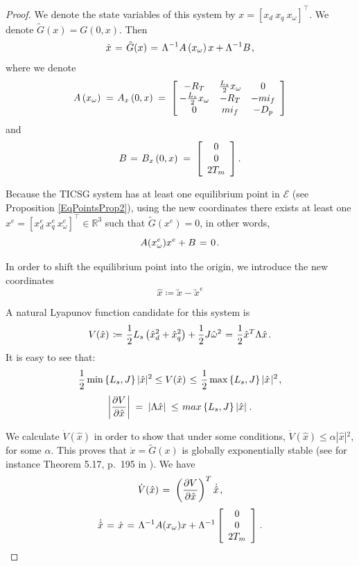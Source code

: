 \documentclass[letterpaper, 10 pt, conference]{ieeeconf}
\newcommand{\rline}  {{\mathbb R}}
\renewcommand{\L}    {{\Lambda}}
\renewcommand{\o}    {{\omega}}
\newcommand{\half}   {{\frac{1}{2}}}
\newcommand{\m}      {{\hbox{\hskip 1pt}}}
\newcommand{\nm}     {{\hbox{\hskip -3pt}}}
\newcommand{\Emscr}  {{\mathcal{E}}}
\begin{document}
\medskip
\begin{proof}
We denote the state variables of this system by $x=\left[x_d\ x_q\ 
x_\o\right]^\top$. We denote $\tilde G(x)=G(0,x)$. Then
$$ \dot{x} \m=\m \tilde{G}(x) \m=\m \L^{-1} A\left( x_\o \right)x +
   \L^{-1} B \m,$$
where we denote
$$ A\left( x_\o \right) \m=\m A_x\left(0,x\right) \m=\m \left[\nm
   \begin{array}{ccc} - R_T & \frac{L_s}{2} x_\o & 0\\ -\frac{L_s}{2}
   x_\o & -R_T & -mi_f\\ 0 & mi_f & -D_p \end{array}\right]$$
and
$$ B \m=\m B_x\left(0,x \right) \m=\m \left[\begin{array}{c} 
   0\\ 0\\ 2T_m \end{array}\right].$$

Because the TICSG system has at least one equilibrium point in
$\Emscr$ (see Proposition \ref{EqPointsProp2}), using the new
coordinates there exists at least one $x^e=\left[x_d^e\ x_q^e\ 
x_\o^e\right]^\top\in\rline^3$ such that $\tilde{G}(x^e)=0$, 
in other words, 
\begin{equation} \label{eq:G_at_equilibrium}
   A(x_\o^e) x^e + B \m=\m 0 \m.
\end{equation}

In order to shift the equilibrium point into the origin, we introduce the new  coordinates
$$
\hat{x}\coloneqq\tilde{x}-\tilde{x}^{e}
$$

A natural Lyapunov function candidate for this system is 
$$ V(\hat{x}) \m\coloneqq\m \half L_s\left(\hat{x}_d^2+\hat{x}_q^2
   \right)+\half J\hat{\o}^2 \m=\m \half\hat{x}^T\L\hat{x} \m.$$
It is easy to see that:
$$ \half \min\left\{L_{s},J\right\}|\hat{x}|{}^{2}\leq V(\hat{x})
   \m\leq\m \frac{1}{2} \max\left\{L_{s},J\right\}|\hat{x}\m
   |^{2} \m,$$
$$ \left|\frac{\partial V}{\partial\hat{x}}\right| \m=\m \left|
   \L\hat{x}\right| \m\leq\m max\left\{L_s,J\right\}\left|
   \hat{x}\right| \m.$$

We calculate $\dot{V}(\hat{x})$ in order to show that under some
conditions, $\dot{V}(\hat{x})\leq\alpha|\hat{x}|{}^{2}$, for some
$\alpha$. This proves that $\dot x=\tilde{G}(x)$ is globally
exponentially stable (see for instance Theorem 5.17, p.~195 in
\cite{Sastry}). We have
$$ \dot{V}(\hat{x}) \m=\m \left(\frac{\partial V}{\partial
   \hat{x}}\right)^{T}\dot{\hat{x}} \m,$$
\begin{equation} \label{eq:x_hat_dynamic}
   \dot{\hat{x}} \m=\m \dot{x} \m=\m \L^{-1} A(x_\o) x+\L^{-1}
   \left[\begin{array}{c} 0\\ 0\\ 2T_m \end{array}\right] \m.
\end{equation}
 

\end{proof}
\end{document}
